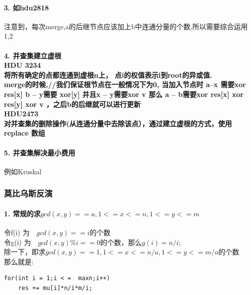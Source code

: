 \documentclass{article}
\begin{document}
\paragraph{3. 如hdu2818\\}
注意到，每次merge,a的后继节点应该加上b中连通分量的个数,所以需要综合运用1,2 \\

\paragraph{4. 并查集建立虚根\\
HDU 3234\\
将所有确定的点都连通到虚根n上， 点i的权值表示i到root的异或值. \\ merge的时候,//我们保证根节点在一般情况下为0, 当加入节点时 a--x 需要xor res[x]  b -- y需要 xor[y] 并且x -- y需要xor v 那么 a -- b需要xor res[x] xor res[y] xor v ，之后b的后继就可以进行更新\\
HDU2473 \\
对并查集的删除操作(从连通分量中去除该点），通过建立虚根的方式，使用replace 数组 \\ }

\paragraph{5. 并查集解决最小费用\\}
例如Kruskal

\subsubsection{莫比乌斯反演}
\paragraph{1. 常规的求$gcd(x,y) == a, 1 <= x <= n,1 <= y <= m $\\}
令f(i) 为　$gcd(x,y) == i$的个数\\
令g(i) 为　$gcd(x,y) \% i == 0$的个数，那么$g(i) = n/i$; \\
除一下，即求$gcd(x,y) == 1, 1<= x <= n/a, 1 <= y <= m/a$的个数\\
那么就是:\\
\begin{lstlisting}
for(int i = 1;i < =  maxn;i++)
	res += mu[i]*n/i*m/i;
\end{lstlisting}
\end{document}
